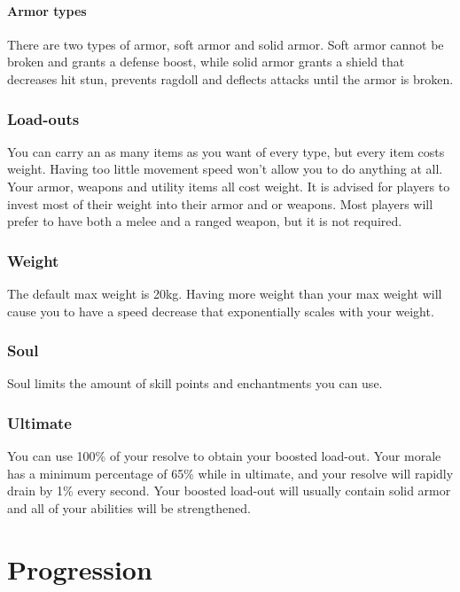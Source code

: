 \documentclass{report}
\begin{document}
    \subsubsection{Armor types}
        There are two types of armor, soft armor and solid armor. Soft armor cannot be broken and grants a defense boost, while solid armor grants a shield that decreases hit stun, prevents ragdoll and deflects attacks until the armor is broken.


    
    
    \subsection{Load-outs}
    You can carry an as many items as you want of every type, but every item costs weight. Having too little movement speed won't allow you to do anything at all.
    Your armor, weapons and utility items all cost weight. It is advised for players to invest most of their weight into their armor and or weapons. 
    Most players will prefer to have both a melee and a ranged weapon, but it is not required.
    \subsection{Weight}
            The default max weight is 20kg. Having more weight than your max weight will cause you to have a speed decrease that exponentially scales with your weight.
            
    \subsection{Soul}
            Soul limits the amount of skill points and enchantments you can use.

        
    


    

    \subsection{Ultimate}
        You can use 100\% of your resolve to obtain your boosted load-out. Your morale has a minimum percentage of 65\% while in ultimate, and your resolve will rapidly drain by 1\% every second. Your boosted load-out will usually contain solid armor and all of your abilities will be strengthened.
\chapter{Progression}
\end{document}
